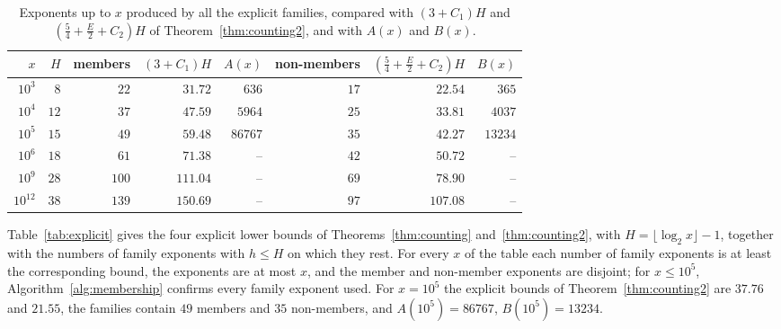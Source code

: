 \documentclass[11pt]{amsart}
\theoremstyle{definition}
\begin{document}
\begin{table}[H]
\centering
\caption{Exponents up to $x$ produced by all the explicit families, compared with $(3+C_1)H$ and $(\frac54+\frac E2+C_2)H$ of Theorem~\ref{thm:counting2}, and with $A(x)$ and $B(x)$.}
\label{tab:allfam}
\begin{tabular}{rrrrrrrr}
\toprule
$x$ & $H$ & members & $(3+C_1)H$ & $A(x)$ & non-members & $(\frac54+\frac E2+C_2)H$ & $B(x)$\\
\midrule
$10^3$ & $8$ & $22$ & $31.72$ & $636$ & $17$ & $22.54$ & $365$\\
$10^4$ & $12$ & $37$ & $47.59$ & $5964$ & $25$ & $33.81$ & $4037$\\
$10^5$ & $15$ & $49$ & $59.48$ & $86767$ & $35$ & $42.27$ & $13234$\\
$10^6$ & $18$ & $61$ & $71.38$ & -- & $42$ & $50.72$ & --\\
$10^9$ & $28$ & $100$ & $111.04$ & -- & $69$ & $78.90$ & --\\
$10^{12}$ & $38$ & $139$ & $150.69$ & -- & $97$ & $107.08$ & --\\
\bottomrule
\end{tabular}
\end{table}

Table~\ref{tab:explicit} gives the four explicit lower bounds of Theorems~\ref{thm:counting} and~\ref{thm:counting2}, with $H=\lfloor\log_2x\rfloor-1$, together with the numbers of family exponents with $h\le H$ on which they rest. For every $x$ of the table each number of family exponents is at least the corresponding bound, the exponents are at most $x$, and the member and non-member exponents are disjoint; for $x\le10^5$, Algorithm~\ref{alg:membership} confirms every family exponent used. For $x=10^5$ the explicit bounds of Theorem~\ref{thm:counting2} are $37.76$ and $21.55$, the families contain $49$ members and $35$ non-members, and $A(10^5)=86767$, $B(10^5)=13234$.
\end{document}
